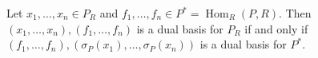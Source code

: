 Let $x_1, \ldots, x_n \in P_R$ and $f_1, \ldots, f_n \in P^* = \operatorname{Hom}_R(P, R)$. Then $(x_1, \ldots, x_n), (f_1, \ldots, f_n)$ is a dual basis for $P_R$ if and only if $(f_1, \ldots, f_n), (\sigma_P(x_1), \ldots, \sigma_P(x_n))$ is a dual basis for $P^*$.
